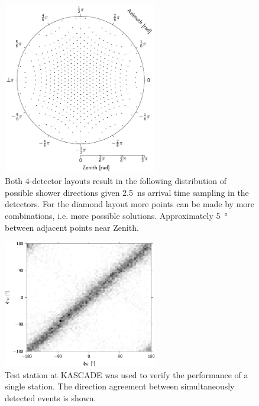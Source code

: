 \begin{figure}
    \centering
    \includegraphics[width=0.6\textwidth]
                    {plots/experiment/discrete_directions}
    \caption{Both 4-detector layouts result in the following distribution of possible shower directions given \SI{2.5}{\ns} arrival time sampling in the detectors. For the diamond layout more points can be made by more combinations, i.e. more possible solutions. Approximately \SI{5}{\degree} between adjacent points near Zenith.}
    \label{fig:discrete_directions}
\end{figure}


\begin{figure}
    \centering
    \includegraphics[width=0.6\textwidth]
                    {plots/experiment/azimuth_kascade_minn1}
    \caption{Test station at KASCADE was used to verify the performance of a single station. The direction agreement between simultaneously detected events is shown.}
    \label{fig:azimuth_kascade_minn1}
\end{figure}

